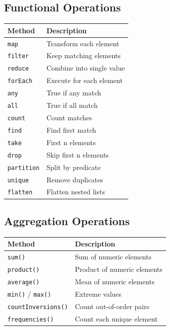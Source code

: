 \documentclass[11pt,a4paper]{article}
\begin{document}
\subsection{Functional Operations}

\begin{center}
\begin{tabular}{|l|p{10cm}|}
\hline
\textbf{Method} & \textbf{Description} \\
\hline
\texttt{map} & Transform each element \\
\texttt{filter} & Keep matching elements \\
\texttt{reduce} & Combine into single value \\
\texttt{forEach} & Execute for each element \\
\texttt{any} & True if any match \\
\texttt{all} & True if all match \\
\texttt{count} & Count matches \\
\texttt{find} & Find first match \\
\texttt{take} & First n elements \\
\texttt{drop} & Skip first n elements \\
\texttt{partition} & Split by predicate \\
\texttt{unique} & Remove duplicates \\
\texttt{flatten} & Flatten nested lists \\
\hline
\end{tabular}
\end{center}

\subsection{Aggregation Operations}

\begin{center}
\begin{tabular}{|l|p{9cm}|}
\hline
\textbf{Method} & \textbf{Description} \\
\hline
\texttt{sum()} & Sum of numeric elements \\
\texttt{product()} & Product of numeric elements \\
\texttt{average()} & Mean of numeric elements \\
\texttt{min()} / \texttt{max()} & Extreme values \\
\texttt{countInversions()} & Count out-of-order pairs \\
\texttt{frequencies()} & Count each unique element \\
\hline
\end{tabular}
\end{center}
\end{document}
